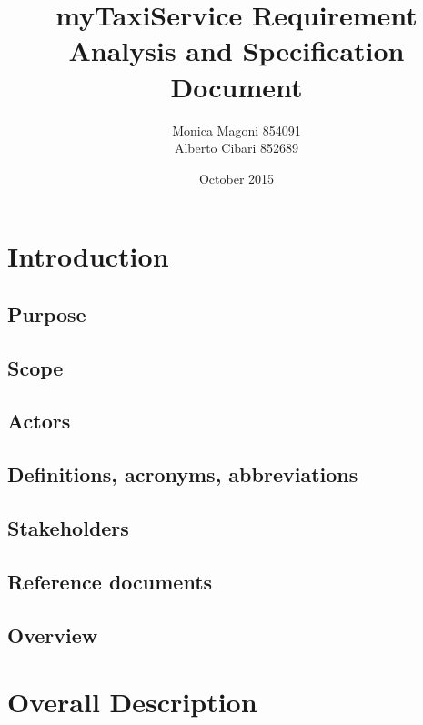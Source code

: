 \documentclass{article}
\title{
	\Huge{\textbf{myTaxiService}}
	\newline
	\huge{\textbf{R}equirement \textbf{A}nalysis and \textbf{S}pecification \textbf{D}ocument}
}
\author{
	Monica Magoni 854091
	\\
	Alberto Cibari 852689
}
\date{October 2015}
\begin{document}
	\maketitle
	\newpage
	\renewcommand*\contentsname{\Huge{Summary}}
	\tableofcontents
	
	\newpage
	
\section{Introduction}
	
	\subsection{Purpose}
	
	
	\subsection{Scope}
	
	
	\subsection{Actors}
	
	
	\subsection{Definitions, acronyms, abbreviations}
	
	
	\subsection{Stakeholders}
	
	
	\subsection{Reference documents}
	

	\subsection{Overview}
	
	
	
\newpage
\section{Overall Description}
\end{document}
